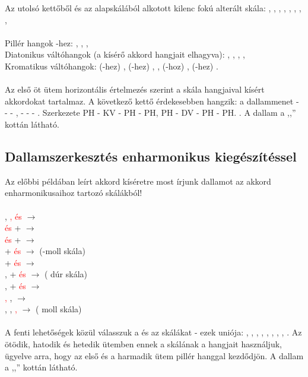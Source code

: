 Az utolsó kettőből és az alapskálából alkotott kilenc fokú alterált skála:
, , , , , , , ,  \\\\
Pillér hangok -hez:
, , ,  \\
Diatonikus váltóhangok (a kísérő akkord hangjait elhagyva):
, , , ,  \\
Kromatikus váltóhangok:
(-hez) ,
(-hez) , ,
(-hoz) ,
(-hez) . \\\\
Az első öt ütem horizontális értelmezés szerint a skála hangjaival kísért akkordokat tartalmaz. A következő kettő érdekesebben hangzik: a dallammenet   -  -  - ,  -  -  - . Szerkezete PH - KV - PH - PH, PH - DV - PH - PH. . A dallam a ,,'' kottán látható.

\subsection{Dallamszerkesztés enharmonikus kiegészítéssel}
\label{sec:exdallamenharm}
Az előbbi példában leírt akkord kíséretre most írjunk dallamot az  akkord enharmonikusaihoz tartozó skálákból! \\\\
, \textcolor{red}{,  és } $\longrightarrow$  \\
\textcolor{red}{ és } +  $\longrightarrow$  \\
\textcolor{red}{ és } +  $\longrightarrow$  \\
 + \textcolor{red}{ és } $\longrightarrow$  (-moll skála)\\
 + \textcolor{red}{ és } $\longrightarrow$  \\
,  + \textcolor{red}{ és } $\longrightarrow$  ( dúr skála) \\
,  + \textcolor{red}{ és } $\longrightarrow$  \\
\textcolor{red}{, },  $\longrightarrow$  \\
, , \textcolor{red}{, } $\longrightarrow$  ( moll skála) \\\\
A fenti lehetőségek közül válasszuk a  és az  skálákat - ezek uniója: , , , , , , , , . Az ötödik, hatodik és hetedik ütemben ennek a skálának a hangjait használjuk, ügyelve arra, hogy az első és a harmadik ütem pillér hanggal kezdődjön. A dallam a ,,'' kottán látható.
 
